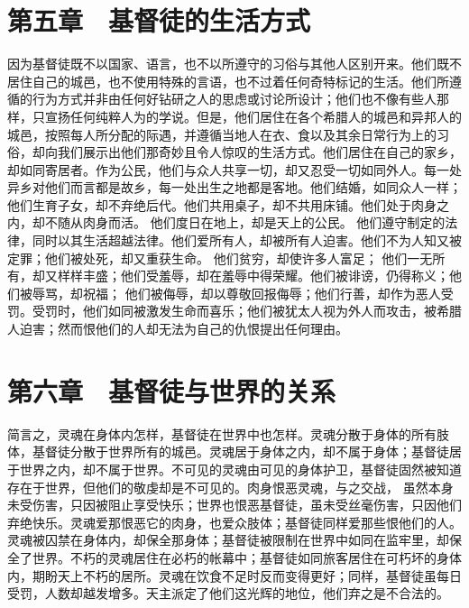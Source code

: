 
\section{第五章　基督徒的生活方式}

因为基督徒既不以国家、语言，也不以所遵守的习俗与其他人区别开来。他们既不居住自己的城邑，也不使用特殊的言语，也不过着任何奇特标记的生活。他们所遵循的行为方式并非由任何好钻研之人的思虑或讨论所设计；他们也不像有些人那样，只宣扬任何纯粹人为的学说。但是，他们居住在各个希腊人的城邑和异邦人的城邑，按照每人所分配的际遇，并遵循当地人在衣、食以及其余日常行为上的习俗，却向我们展示出他们那奇妙且令人惊叹的生活方式。他们居住在自己的家乡，却如同寄居者。作为公民，他们与众人共享一切，却又忍受一切如同外人。每一处异乡对他们而言都是故乡，每一处出生之地都是客地。他们结婚，如同众人一样；他们生育子女，却不弃绝后代。他们共用桌子，却不共用床铺。他们处于肉身之内，却不随从肉身而活。 他们度日在地上，却是天上的公民。 他们遵守制定的法律，同时以其生活超越法律。他们爱所有人，却被所有人迫害。他们不为人知又被定罪；他们被处死，却又重获生命。 他们贫穷，却使许多人富足； 他们一无所有，却又样样丰盛；他们受羞辱，却在羞辱中得荣耀。他们被诽谤，仍得称义；他们被辱骂，却祝福； 他们被侮辱，却以尊敬回报侮辱；他们行善，却作为恶人受罚。受罚时，他们如同被激发生命而喜乐；他们被犹太人视为外人而攻击，被希腊人迫害；然而恨他们的人却无法为自己的仇恨提出任何理由。\par


\section{第六章　基督徒与世界的关系}

简言之，灵魂在身体内怎样，基督徒在世界中也怎样。灵魂分散于身体的所有肢体，基督徒分散于世界所有的城邑。灵魂居于身体之内，却不属于身体；基督徒居于世界之内，却不属于世界。不可见的灵魂由可见的身体护卫，基督徒固然被知道存在于世界，但他们的敬虔却是不可见的。肉身恨恶灵魂，与之交战， 虽然本身未受伤害，只因被阻止享受快乐；世界也恨恶基督徒，虽未受丝毫伤害，只因他们弃绝快乐。灵魂爱那恨恶它的肉身，也爱众肢体；基督徒同样爱那些恨他们的人。灵魂被囚禁在身体内，却保全那身体；基督徒被限制在世界中如同在监牢里，却保全了世界。不朽的灵魂居住在必朽的帐幕中；基督徒如同旅客居住在可朽坏的身体内，期盼天上不朽的居所。灵魂在饮食不足时反而变得更好；同样，基督徒虽每日受罚，人数却越发增多。天主派定了他们这光辉的地位，他们弃之是不合法的。\par

